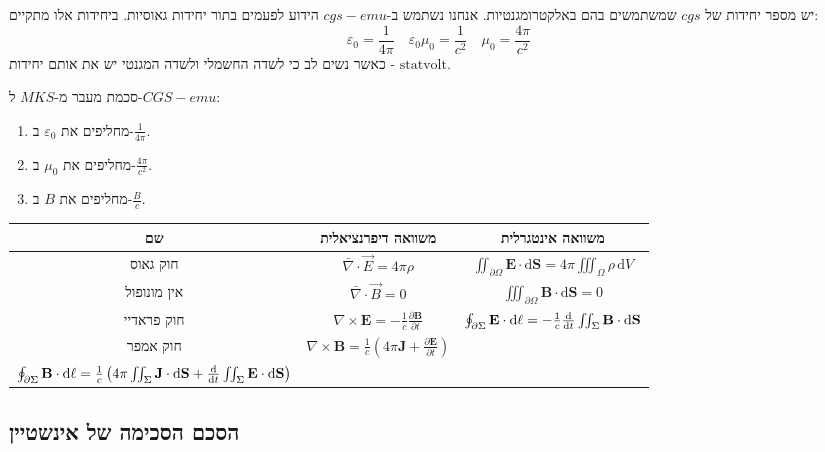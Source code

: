 \documentclass{tstextbook}
\begin{document}
יש מספר יחידות של \(cgs\) שמשתמשים בהם באלקטרומגנטיות. אנחנו נשתמש ב-\(cgs-emu\) הידוע לפעמים בתור יחידות גאוסיות. ביחידות אלו מתקיים:
$$\varepsilon_{0}=\frac{1}{4\pi}\quad \varepsilon_{0}\mu_{0}=\frac{1}{c^{2}}\quad \mu_{0}=\frac{4\pi}{c^{2}}$$
כאשר נשים לב כי לשדה החשמלי ולשדה המגנטי יש את אותם יחידות - \(\mathrm{statvolt}\).

סכמת מעבר מ-\(MKS\) ל-\(CGS-emu\):

\begin{enumerate}
  \item מחליפים את \(\varepsilon_{0}\) ב-\(\frac{1}{4\pi}\). 


  \item מחליפים את \(\mu_{0}\) ב-\(\frac{4\pi}{c^{2}}\). 


  \item מחליפים את \(B\) ב-\(\frac{B}{c}\). 


\end{enumerate}
\begin{table}[htbp]
  \centering
  \begin{tabular}{|ccc|}
    \hline
    שם & משוואה דיפרנציאלית & משוואה אינטגרלית \\ \hline
    חוק גאוס & \(\bar{\nabla} \cdot \vec{E}=4\pi \rho\) & \(\iint_{\partial\Omega}\mathbf{E}\cdot\mathrm{d}\mathbf{S}=4\pi\iiint_{\Omega}\rho\,\mathrm{d}V\) \\ \hline
    אין מונופול & \(\bar{\nabla} \cdot \vec{B}=0\) & \(\iiint_{\partial\Omega}\mathbf{B}\cdot\mathrm{d}\mathbf{S}=0\) \\ \hline
    חוק פראדיי & \(\nabla\times\mathbf{E}=-{\frac{1}{c}}{\frac{\partial\mathbf{B}}{\partial t}}\) & \(\oint_{\partial\Sigma}\mathbf{E}\cdot\mathrm{d}{\bf{\ell}}=-{\frac{1}{c}}{\frac{\mathrm{d}}{\mathrm{d}t}}\iint_{\Sigma}\mathbf{B}\cdot\mathrm{d}\mathbf{S}\) \\ \hline
    חוק אמפר & \(\nabla\times\mathbf{B}={\frac{1}{c}}\left(4\pi\mathbf{J}+{\frac{\partial\mathbf{E}}{\partial t}}\right)\) & \\
\(\oint_{\partial\Sigma}\mathbf{B}\cdot\mathrm{d}{\bf{\ell}}={\frac{1}{c}}\left(4\pi\iint_{\Sigma}\mathbf{J}\cdot\mathrm{d}\mathbf{S}+{\frac{\mathrm{d}}{\mathrm{d}t}}\iint_{\Sigma}\mathbf{E}\cdot\mathrm{d}\mathbf{S}\right)\) \\ \hline
  \end{tabular}
\end{table}
\subsection{הסכם הסכימה של אינשטיין}
\end{document}
